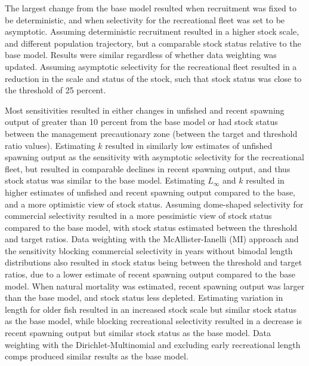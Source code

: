 \documentclass[11pt,
  english,
  a4paper,
]{article}
\begin{document}
\leavevmode\tagmcend\tagstructend\par


The largest change from the base model resulted when recruitment was fixed to be deterministic, and when selectivity for the recreational fleet was set to be asymptotic. Assuming deterministic recruitment resulted in a higher stock scale, and different population trajectory, but a comparable stock status relative to the base model. Results were similar regardless of whether data weighting was updated. Assuming asymptotic selectivity for the recreational fleet resulted in a reduction in the scale and status of the stock, such that stock status was close to the threshold of 25 percent.

\leavevmode\tagmcend\tagstructend\par


Most sensitivities resulted in either changes in unfished and recent spawning output of greater than 10 percent from the base model or had stock status between the management precautionary zone (between the target and threshold ratio values). Estimating {\(k\)\leavevmode\tagmcend\tagstructend} resulted in similarly low estimates of unfished spawning output as the sensitivity with asymptotic selectivity for the recreational fleet, but resulted in comparable declines in recent spawning output, and thus stock status was similar to the base model. Estimating {\(L_{\infty}\)\leavevmode\tagmcend\tagstructend} and {\(k\)\leavevmode\tagmcend\tagstructend} resulted in higher estimates of unfished and recent spawning output compared to the base, and a more optimistic view of stock status. Assuming dome-shaped selectivity for commercial selectivity resulted in a more pessimistic view of stock status compared to the base model, with stock status estimated between the threshold and target ratios. Data weighting with the McAllister-Ianelli (MI) approach and the sensitivity blocking commercial selectivity in years without bimodal length distributions also resulted in stock status being between the threshold and target ratios, due to a lower estimate of recent spawning output compared to the base model. When natural mortality was estimated, recent spawning output was larger than the base model, and stock status less depleted. Estimating variation in length for older fish resulted in an increased stock scale but similar stock status as the base model, while blocking recreational selectivity resulted in a decrease is recent spawning output but similar stock status as the base model. Data weighting with the Dirichlet-Multinomial and excluding early recreational length comps produced similar results as the base model.
\end{document}
